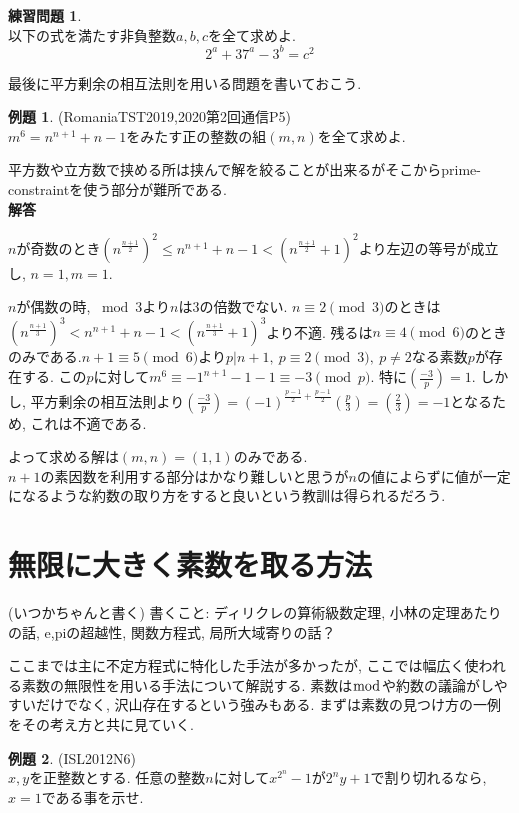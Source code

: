 \documentclass{ltjsarticle}
\theoremstyle{definition}
\newtheorem{prob}{練習問題}
\newtheorem{expr}{例題}
\begin{document}
\begin{prob}\ \\
以下の式を満たす非負整数$a,b,c$を全て求めよ.$$2^a+37^a-3^b=c^2$$
\end{prob}

最後に平方剰余の相互法則を用いる問題を書いておこう.

\begin{expr}(RomaniaTST2019,2020第2回通信P5)\\
$m^6=n^{n+1}+n-1$をみたす正の整数の組$(m,n)$を全て求めよ.
\end{expr}

平方数や立方数で挟める所は挟んで解を絞ることが出来るがそこからprime-constraintを使う部分が難所である.\\
\textbf{解答}

$n$が奇数のとき$(n^{\frac{n+1}2})^2\leq n^{n+1}+n-1<(n^{\frac{n+1}2}+1)^2$より左辺の等号が成立し, $n=1,m=1$.

$n$が偶数の時, $\bmod3$より$n$は$3$の倍数でない. $n\equiv 2\pmod3$のときは$(n^{\frac{n+1}3})^3< n^{n+1}+n-1<(n^{\frac{n+1}3}+1)^3$より不適. 残るは$n\equiv 4\pmod6$のときのみである.$n+1\equiv5\pmod6$より$p|n+1,\ p\equiv2\pmod3,\ p\neq2$なる素数$p$が存在する. この$p$に対して$m^6\equiv-1^{n+1}-1-1\equiv-3\pmod p$. 特に$\displaystyle\left(\frac{-3}p\right)=1$. しかし, 平方剰余の相互法則より$\displaystyle\left(\frac{-3}p\right)=(-1)^{\frac{p-1}2+\frac{p-1}2}\left(\frac p3\right)=\left(\frac 23\right)=-1$となるため, これは不適である.

よって求める解は$(m,n)=(1,1)$のみである.\\

$n+1$の素因数を利用する部分はかなり難しいと思うが$n$の値によらずに値が一定になるような約数の取り方をすると良いという教訓は得られるだろう.

\section{無限に大きく素数を取る方法}(いつかちゃんと書く)
書くこと: ディリクレの算術級数定理, 小林の定理あたりの話, e,piの超越性, 関数方程式, 局所大域寄りの話？

ここまでは主に不定方程式に特化した手法が多かったが, ここでは幅広く使われる素数の無限性を用いる手法について解説する. 素数は$\bmod$や約数の議論がしやすいだけでなく, 沢山存在するという強みもある. まずは素数の見つけ方の一例をその考え方と共に見ていく.

\begin{expr}(ISL2012N6)\\
$x,y$を正整数とする. 任意の整数$n$に対して$x^{2^n}-1$が$2^ny+1$で割り切れるなら, $x=1$である事を示せ.
\end{expr}
\end{document}
